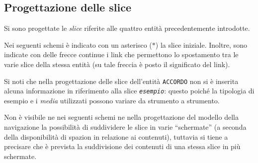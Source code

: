 \subsection{Progettazione delle slice}
Si sono progettate le \emph{slice} riferite alle quattro entità precedentemente introdotte.

Nei seguenti schemi è indicato con un asterisco ($\ast$) la slice iniziale. Inoltre, sono indicate con delle frecce continue i link che permettono lo spostamento tra le varie slice della stessa entità (su tale freccia è posto il significato del link).

Si noti che nella progettazione delle slice dell'entità \texttt{ACCORDO} non si è inserita alcuna informazione in riferimento alla slice \textit{\texttt{esempio}}: questo poiché la tipologia di esempio e i \textit{media} utilizzati possono variare da strumento a strumento.

Non è visibile ne nei seguenti schemi ne nella progettazione del modello della navigazione la possibilità di suddividere le slice in varie ``schermate'' (a seconda della disponibilità di spazion in relazione ai contenuti), tuttavia si tiene a precisare che è prevista la suddivisione dei contenuti di una stessa slice in più schermate.

